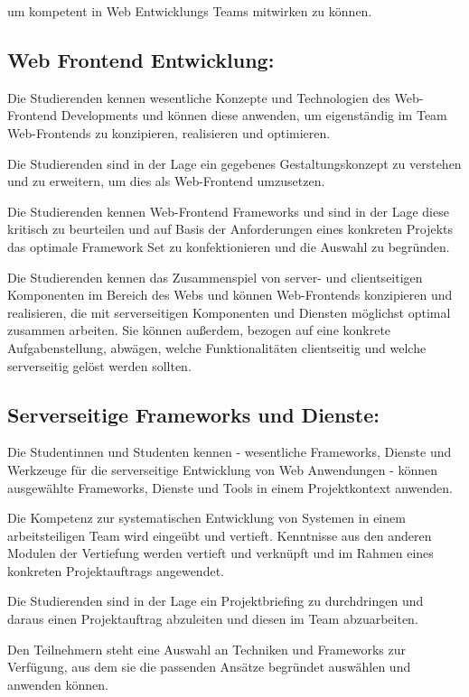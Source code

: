 um kompetent in Web Entwicklungs Teams mitwirken zu können.

\subsection{Web Frontend
Entwicklung:}\label{web-frontend-entwicklung}

Die Studierenden kennen wesentliche Konzepte und Technologien des
Web-Frontend Developments und können diese anwenden, um eigenständig im
Team Web-Frontends zu konzipieren, realisieren und optimieren.

Die Studierenden sind in der Lage ein gegebenes Gestaltungskonzept zu
verstehen und zu erweitern, um dies als Web-Frontend umzusetzen.

Die Studierenden kennen Web-Frontend Frameworks und sind in der Lage
diese kritisch zu beurteilen und auf Basis der Anforderungen eines
konkreten Projekts das optimale Framework Set zu konfektionieren und die
Auswahl zu begründen.

Die Studierenden kennen das Zusammenspiel von server- und clientseitigen
Komponenten im Bereich des Webs und können Web-Frontends konzipieren und
realisieren, die mit serverseitigen Komponenten und Diensten möglichst
optimal zusammen arbeiten. Sie können außerdem, bezogen auf eine
konkrete Aufgabenstellung, abwägen, welche Funktionalitäten clientseitig
und welche serverseitig gelöst werden sollten.

\subsection{Serverseitige Frameworks und
Dienste:}\label{serverseitige-frameworks-und-dienste}

Die Studentinnen und Studenten kennen - wesentliche Frameworks, Dienste
und Werkzeuge für die serverseitige Entwicklung von Web Anwendungen -
können ausgewählte Frameworks, Dienste und Tools in einem Projektkontext
anwenden.

Die Kompetenz zur systematischen Entwicklung von Systemen in einem
arbeitsteiligen Team wird eingeübt und vertieft. Kenntnisse aus den
anderen Modulen der Vertiefung werden vertieft und verknüpft und im
Rahmen eines konkreten Projektauftrags angewendet.

Die Studierenden sind in der Lage ein Projektbriefing zu durchdringen
und daraus einen Projektauftrag abzuleiten und diesen im Team
abzuarbeiten.

Den Teilnehmern steht eine Auswahl an Techniken und Frameworks zur
Verfügung, aus dem sie die passenden Ansätze begründet auswählen und
anwenden können.

